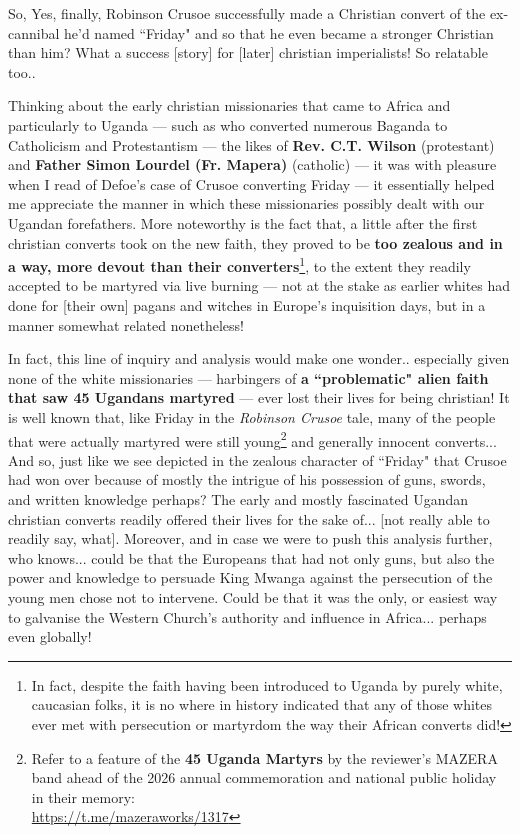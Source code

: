 \documentclass[a4paper]{article}
\begin{document}
So, Yes, finally, Robinson Crusoe successfully made a Christian convert of the ex-cannibal he'd named ``Friday" and so that he even became a stronger Christian than him? What a success [story] for [later] christian imperialists! So relatable too..

Thinking about the early christian missionaries that came to Africa and particularly to Uganda --- such as who converted numerous Baganda to Catholicism and Protestantism --- the likes of \textbf{Rev. C.T. Wilson} (protestant) and \textbf{Father Simon Lourdel (Fr. Mapera)} (catholic) --- it was with pleasure when I read of Defoe's case of Crusoe converting Friday --- it essentially helped me appreciate the manner in which these missionaries possibly dealt with our Ugandan forefathers. More noteworthy is the fact that, a little after the first christian converts took on the new faith, they proved to be \textbf{too zealous and in a way, more devout than their converters}\footnote{In fact, despite the faith having been introduced to Uganda by purely white, caucasian folks, it is no where in history indicated that any of those whites ever met with persecution or martyrdom the way their African converts did!}, to the extent they readily accepted to be martyred via live burning --- not at the stake as earlier whites had done for [their own] pagans and witches in Europe's inquisition days, but in a manner somewhat related nonetheless!

In fact, this line of inquiry and analysis would make one wonder.. especially given none of the white missionaries --- harbingers of \textbf{a ``problematic" alien faith that saw 45 Ugandans martyred} --- ever lost their lives for being christian! It is well known that, like Friday in the \textit{Robinson Crusoe} tale, many of the people that were actually martyred were still young\footnote{Refer to a feature of the \textbf{45 Uganda Martyrs} by the reviewer's MAZERA band ahead of the 2026 annual commemoration and national public holiday in their memory:\\ \url{https://t.me/mazeraworks/1317}} and generally innocent converts... And so, just like we see depicted in the zealous character of ``Friday" that Crusoe had won over because of mostly the intrigue of his possession of guns, swords, and written knowledge perhaps? The early and mostly fascinated Ugandan christian converts readily offered their lives for the sake of... [not really able to readily say, what].  Moreover, and in case we were to push this analysis further, who knows... could be that the Europeans that had not only guns, but also the power and knowledge to persuade King Mwanga against the persecution of the young men chose not to intervene. Could be that it was the only, or easiest way to galvanise the Western Church's authority and influence in Africa... perhaps even globally! 
\end{document}
